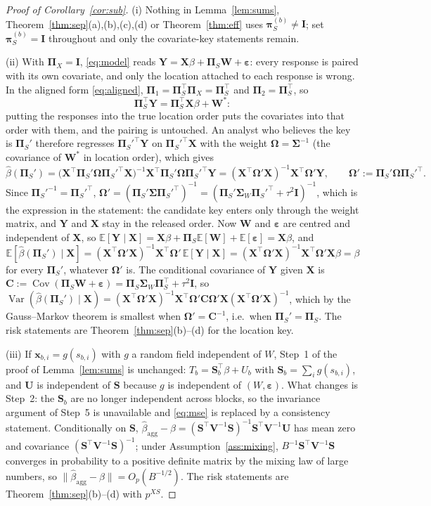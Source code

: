 \documentclass[11pt]{article}
\theoremstyle{definition}
\newcommand{\bX}{\mathbf{X}}
\newcommand{\bx}{\bm{x}}\newcommand{\bg}{\bm{g}}\newcommand{\bw}{\bm{w}}\newcommand{\bz}{\bm{z}}
\newcommand{\bY}{\mathbf{Y}}
\newcommand{\bW}{\mathbf{W}}
\newcommand{\bS}{\mathbf{S}}
\newcommand{\bU}{\mathbf{U}}
\newcommand{\bV}{\mathbf{V}}
\newcommand{\bI}{\mathbf{I}}
\newcommand{\beps}{\boldsymbol{\varepsilon}}
\newcommand{\bSig}{\boldsymbol{\Sigma}}
\newcommand{\bOm}{\boldsymbol{\Omega}}
\newcommand{\bpi}{\boldsymbol{\pi}}
\newcommand{\bPi}{\boldsymbol{\Pi}}
\newcommand{\E}{\mathbb{E}}
\newcommand{\Var}{\operatorname{Var}}
\newcommand{\Cov}{\operatorname{Cov}}
\newcommand{\agg}{\mathrm{agg}}
\begin{document}
\begin{proof}[Proof of Corollary~\ref{cor:sub}]
(i) Nothing in Lemma~\ref{lem:sums}, Theorem~\ref{thm:sep}(a),(b),(c),(d) or Theorem~\ref{thm:eff} uses $\bpi_S^{(b)}\ne\bI$; set $\bpi_S^{(b)}=\bI$ throughout and only the covariate-key statements remain.

(ii) With $\bPi_X=\bI$, \eqref{eq:model} reads $\bY=\bX\beta+\bPi_S\bW+\beps$: every response is paired with its own covariate, and only the location attached to each response is wrong. In the aligned form \eqref{eq:aligned}, $\bPi_1=\bPi_S^\top\bPi_X=\bPi_S^\top$ and $\bPi_2=\bPi_S^\top$, so
\[
\bPi_S^\top\bY=\bPi_S^\top\bX\beta+\bW^\ast :
\]
putting the responses into the true location order puts the covariates into that order with them, and the pairing is untouched. An analyst who believes the key is $\bPi_S'$ therefore regresses $\bPi_S'^\top\bY$ on $\bPi_S'^\top\bX$ with the weight $\bOm=\bSig^{-1}$ (the covariance of $\bW^\ast$ in location order), which gives
\[
\hat\beta(\bPi_S')=\big(\bX^\top\bPi_S'\bOm\bPi_S'^\top\bX\big)^{-1}\bX^\top\bPi_S'\bOm\bPi_S'^\top\bY=(\bX^\top\bOm'\bX)^{-1}\bX^\top\bOm'\bY,\qquad\bOm':=\bPi_S'\bOm\bPi_S'^\top .
\]
Since $\bPi_S'^{-1}=\bPi_S'^\top$, $\bOm'=(\bPi_S'\bSig\bPi_S'^\top)^{-1}=(\bPi_S'\bSig_W\bPi_S'^\top+\tau^2\bI)^{-1}$, which is the expression in the statement: the candidate key enters only through the weight matrix, and $\bY$ and $\bX$ stay in the released order. Now $\bW$ and $\beps$ are centred and independent of $\bX$, so $\E[\bY\mid\bX]=\bX\beta+\bPi_S\E[\bW]+\E[\beps]=\bX\beta$, and
\[
\E[\hat\beta(\bPi_S')\mid\bX]=(\bX^\top\bOm'\bX)^{-1}\bX^\top\bOm'\,\E[\bY\mid\bX]=(\bX^\top\bOm'\bX)^{-1}\bX^\top\bOm'\bX\beta=\beta
\]
for every $\bPi_S'$, whatever $\bOm'$ is. The conditional covariance of $\bY$ given $\bX$ is $\mathbf C:=\Cov(\bPi_S\bW+\beps)=\bPi_S\bSig_W\bPi_S^\top+\tau^2\bI$, so $\Var(\hat\beta(\bPi_S')\mid\bX)=(\bX^\top\bOm'\bX)^{-1}\bX^\top\bOm'\mathbf C\bOm'\bX(\bX^\top\bOm'\bX)^{-1}$, which by the Gauss--Markov theorem is smallest when $\bOm'=\mathbf C^{-1}$, i.e.\ when $\bPi_S'=\bPi_S$. The risk statements are Theorem~\ref{thm:sep}(b)--(d) for the location key.

(iii) If $\bx_{b,i}=g(s_{b,i})$ with $g$ a random field independent of $W$, Step~1 of the proof of Lemma~\ref{lem:sums} is unchanged: $T_b=\bS_b^\top\beta+U_b$ with $\bS_b=\sum_ig(s_{b,i})$, and $\bU$ is independent of $\mathbf S$ because $g$ is independent of $(W,\beps)$. What changes is Step~2: the $\bS_b$ are no longer independent across blocks, so the invariance argument of Step~5 is unavailable and \eqref{eq:mse} is replaced by a consistency statement. Conditionally on $\mathbf S$, $\hat\beta_\agg-\beta=(\mathbf S^\top\bV^{-1}\mathbf S)^{-1}\mathbf S^\top\bV^{-1}\bU$ has mean zero and covariance $(\mathbf S^\top\bV^{-1}\mathbf S)^{-1}$; under Assumption~\ref{ass:mixing}, $B^{-1}\mathbf S^\top\bV^{-1}\mathbf S$ converges in probability to a positive definite matrix by the mixing law of large numbers, so $\|\hat\beta_\agg-\beta\|=O_p(B^{-1/2})$. The risk statements are Theorem~\ref{thm:sep}(b)--(d) with $p^{XS}$.
\end{proof}
\end{document}
